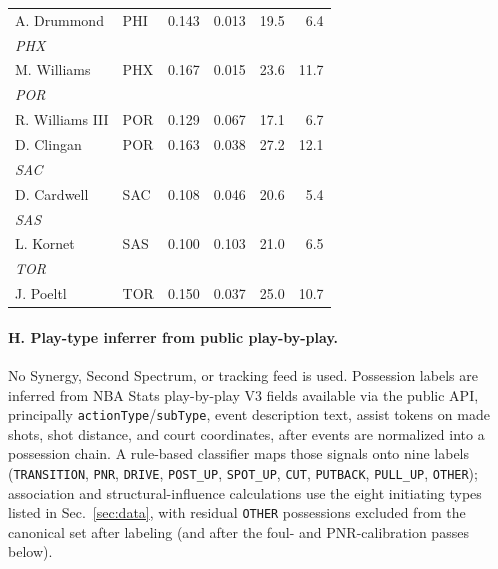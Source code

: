 \documentclass[11pt]{article}
\begin{document}
\begin{longtable}{llrrrr}
A. Drummond & PHI & 0.143 & 0.013 & 19.5 & 6.4 \\
\multicolumn{6}{l}{\textit{PHX}} \\
M. Williams & PHX & 0.167 & 0.015 & 23.6 & 11.7 \\
\multicolumn{6}{l}{\textit{POR}} \\
R. Williams III & POR & 0.129 & 0.067 & 17.1 & 6.7 \\
D. Clingan & POR & 0.163 & 0.038 & 27.2 & 12.1 \\
\multicolumn{6}{l}{\textit{SAC}} \\
D. Cardwell & SAC & 0.108 & 0.046 & 20.6 & 5.4 \\
\multicolumn{6}{l}{\textit{SAS}} \\
L. Kornet & SAS & 0.100 & 0.103 & 21.0 & 6.5 \\
\multicolumn{6}{l}{\textit{TOR}} \\
J. Poeltl & TOR & 0.150 & 0.037 & 25.0 & 10.7 \\
\end{longtable}

\paragraph{H. Play-type inferrer from public play-by-play.}
\label{sec:appendix-inferrer}
No Synergy, Second Spectrum, or tracking feed is used. Possession labels are inferred from
NBA Stats play-by-play V3 fields available via the public API, principally
\texttt{actionType}/\texttt{subType}, event description text, assist tokens on made shots,
shot distance, and court coordinates, after events are normalized into a possession chain.
A rule-based classifier maps those signals onto nine labels
(\texttt{TRANSITION}, \texttt{PNR}, \texttt{DRIVE}, \texttt{POST\_UP}, \texttt{SPOT\_UP},
\texttt{CUT}, \texttt{PUTBACK}, \texttt{PULL\_UP}, \texttt{OTHER}); association and
structural-influence calculations use the eight initiating types listed in
Sec.~\ref{sec:data}, with residual \texttt{OTHER} possessions excluded from the canonical
set after labeling (and after the foul- and PNR-calibration passes below).
\end{document}
